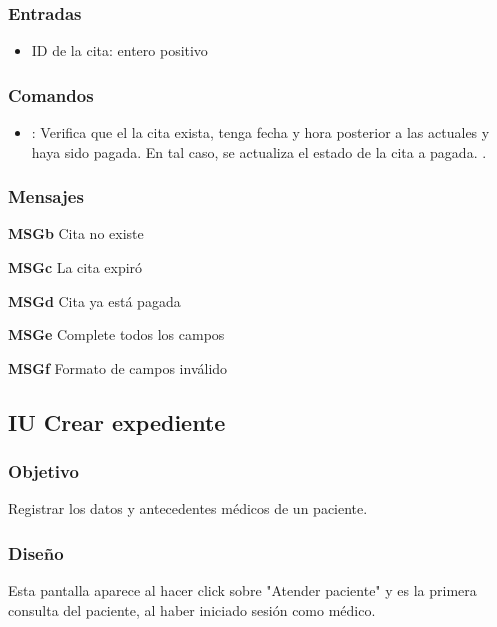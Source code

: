 \subsubsection{Entradas}
\begin{itemize}
	\item ID de la cita: entero positivo
\end{itemize}

\subsubsection{Comandos}
\begin{itemize}
	\item {}:  Verifica que el la cita exista, tenga fecha y hora posterior a las actuales y haya sido pagada. En tal caso, se actualiza el estado de la cita a pagada.  .	
\end{itemize}

\subsubsection{Mensajes}
\begin{Citemize}
	\item {\bf MSGb} Cita no existe
	\item {\bf MSGc} La cita expiró
	\item {\bf MSGd} Cita ya está pagada
	\item {\bf MSGe} Complete todos los campos
	\item {\bf MSGf} Formato de campos inválido
\end{Citemize}

\subsection{IU Crear expediente}

\subsubsection{Objetivo}
Registrar los datos y antecedentes médicos de un paciente.

\subsubsection{Diseño}
Esta pantalla aparece al hacer click sobre "Atender paciente" y es la primera consulta del paciente, al haber iniciado sesión como médico.


